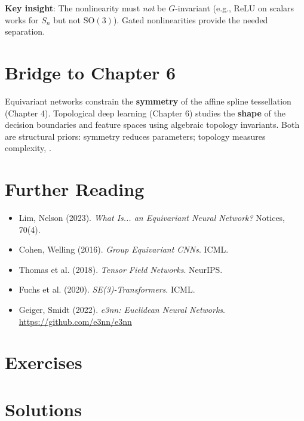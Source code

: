 \textbf{Key insight}: The nonlinearity must \emph{not} be $G$-invariant (e.g., ReLU on scalars works for $S_n$ but not $\mathrm{SO}(3)$). Gated nonlinearities provide the needed separation.

\section{Bridge to Chapter 6}
\label{sec:eq:bridge}

Equivariant networks constrain the \textbf{symmetry} of the affine spline tessellation (Chapter 4). Topological deep learning (Chapter 6) studies the \textbf{shape} of the decision boundaries and feature spaces using algebraic topology invariants. Both are structural priors: symmetry reduces parameters; topology measures complexity, \cite{lim2023equivariant}.

\section{Further Reading}
\label{sec:eq:refs}

\begin{itemize}
    \item Lim, Nelson (2023). \textit{What Is... an Equivariant Neural Network?} Notices, 70(4).
    \item Cohen, Welling (2016). \textit{Group Equivariant CNNs}. ICML.
    \item Thomas et al. (2018). \textit{Tensor Field Networks}. NeurIPS.
    \item Fuchs et al. (2020). \textit{SE(3)-Transformers}. ICML.
    \item Geiger, Smidt (2022). \textit{e3nn: Euclidean Neural Networks}. \url{https://github.com/e3nn/e3nn}
\end{itemize}

\section{Exercises}
\section{Solutions}
\label{sec:eq:solutions}

